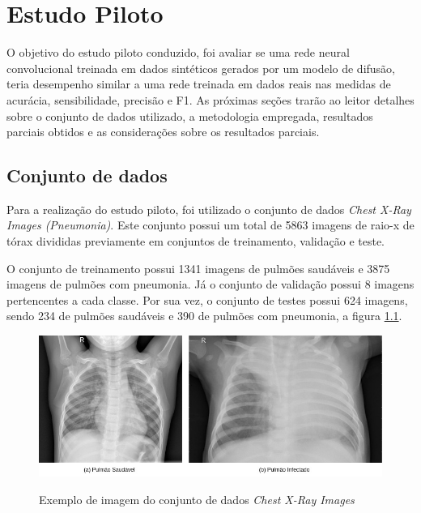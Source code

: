 \chapter{Estudo Piloto} \label{capitulo:estudo-piloto}

O objetivo do estudo piloto conduzido, foi avaliar se uma rede neural convolucional treinada em dados sintéticos gerados por um modelo de difusão, teria desempenho similar a uma rede treinada em dados reais nas medidas de acurácia, sensibilidade, precisão e F1. As próximas seções trarão ao leitor detalhes sobre o conjunto de dados utilizado, a metodologia empregada, resultados parciais obtidos e as considerações sobre os resultados parciais.

\section{Conjunto de dados}

Para a realização do estudo piloto, foi utilizado o conjunto de dados \textit{Chest X-Ray Images (Pneumonia)}. Este conjunto possui um total de 5863 imagens de raio-x de tórax divididas previamente em conjuntos de treinamento, validação e teste.

O conjunto de treinamento possui 1341 imagens de pulmões saudáveis e 3875 imagens de pulmões com pneumonia. Já o conjunto de validação possui 8 imagens pertencentes a cada classe. Por sua vez, o conjunto de testes possui 624 imagens, sendo 234 de pulmões saudáveis e 390 de pulmões com pneumonia, a figura \ref{fig:xray-dataset-sample}.

\begin{figure}[htbp]
	\centering
	\caption[Exemplo de imagem do conjunto de dados \textit{Chest X-Ray Images}]{Exemplo de imagem do conjunto de dados \textit{Chest X-Ray Images}}
		\includegraphics[scale=.4]{imagens/xray-dataset-images.jpg}
	\label{fig:xray-dataset-sample}
\end{figure}

